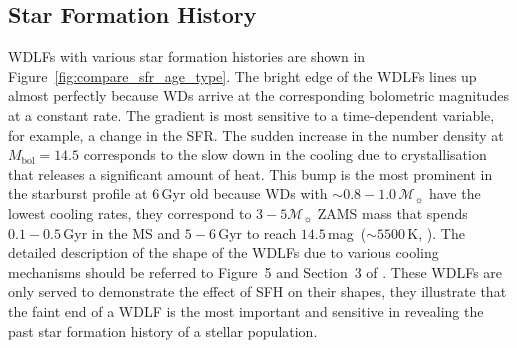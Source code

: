 \documentclass[fleqn,usenatbib]{rasti}
\newcommand{\msun}{\mathcal{M}_{\sun}}
\begin{document}
\subsection{Star Formation History}
WDLFs with various star formation histories are shown in
Figure~\ref{fig:compare_sfr_age_type}. The bright edge of the WDLFs lines up
almost perfectly because WDs arrive at the corresponding bolometric magnitudes
at a constant rate. The gradient is most sensitive to a time-dependent
variable, for example, a change in the SFR. The sudden increase in the number
density at $M_\mathrm{bol}=14.5$ corresponds to the slow down in the cooling
due to crystallisation that releases a significant amount of heat. This bump
is the most prominent in the starburst profile at $6$\,Gyr old because WDs
with $\sim0.8-1.0\,\msun$ have the lowest cooling rates, they correspond
to $3-5\msun$ ZAMS mass that spends $0.1-0.5$\,Gyr in the MS and $5-6$\,Gyr
to reach $14.5$\,mag~($\sim 5500$\,K, \citealp{2019ApJ...876...67B}). The
detailed description of the shape of the WDLFs due to various cooling
mechanisms should be referred to Figure~5 and Section~3
of \citep{2001PASP..113..409F}. These WDLFs are only served to demonstrate
the effect of SFH on their shapes, they illustrate that the faint end
of a WDLF is the most important and sensitive in revealing the past
star formation history of a stellar population.
\end{document}
